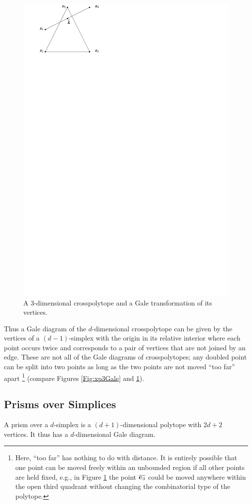     \begin{figure}[hbt]
        \centering
            \includegraphics[width=.7\textwidth, page=15]{pictures.pdf}
        \caption{A $3$-dimensional crosspolytope and a Gale transformation of its vertices.\label{Fig:x3Gale}}
    \end{figure}

    Thus a Gale diagram of the \(d\)-dimensional crosspolytope can be given by the vertices of a \((d-1)\)-simplex with the origin in its relative interior where each point occurs twice and corresponds to a pair of vertices that are not joined by an edge.  These are not all of the Gale diagrams of crosspolytopes; any doubled point can be split into two points as long as the two points are not moved ``too far'' apart \footnote{Here, ``too far'' has nothing to do with distance.  It is entirely possible that one point can be moved freely within an unbounded region if all other points are held fixed, e.g.{}, in Figure \ref{Fig:x3Gale} the point $\overline{\bm{e}_3}$ could be moved anywhere within the open third quadrant without changing the combinatorial type of the polytope.}  (compare Figures \ref{Fig:xp3Gale} and \ref{Fig:x3Gale}).

\subsection{Prisms over Simplices}
    A prism over a \(d\)-simplex is a \((d+1)\)-dimensional polytope with \(2d+2\) vertices.  It thus has a \(d\)-dimensional Gale diagram.

